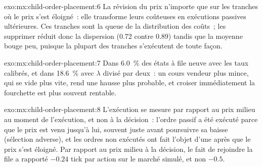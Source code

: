 \begin{solution}{exo:mx:child-order-placement:6}
La révision du prix n'importe que sur les tranches où le prix s'est éloigné~: elle transforme leurs  coûteuses en exécutions passives ultérieures. Ces tranches sont la
queue de la distribution des coûts~; les supprimer réduit donc la dispersion (0.72 contre 0.89) tandis que la moyenne bouge peu, puisque la plupart des tranches s'exécutent
de toute façon.
\end{solution}

\begin{solution}{exo:mx:child-order-placement:7}
Dans 6.0~\% des états à file neuve avec les taux calibrés, et dans 18.6~\% avec $\lambda$ divisé par deux~: un cours vendeur plus mince, qui se vide plus vite, rend une hausse plus probable,
et croiser immédiatement la fourchette est plus souvent rentable.
\end{solution}

\begin{solution}{exo:mx:child-order-placement:8}
L'exécution se mesure par rapport au prix milieu au moment de l'exécution, et non à la décision~: l'ordre passif a été exécuté parce que le prix est venu jusqu'à lui, souvent juste avant
poursuivre sa baisse (sélection adverse), et les ordres non exécutés ont fait l'objet d'une  après que le prix s'est éloigné. Par rapport au prix milieu à la décision,
le fait de rejoindre la file a rapporté $-0.24$ tick par action sur le marché simulé, et non $-0.5$.
\end{solution}

